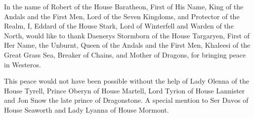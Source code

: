 In the name of Robert of the House Baratheon, First of His Name, King of the Andals and the First Men, Lord of the Seven Kingdoms, and Protector of the Realm, I, Eddard of the House Stark, Lord of Winterfell and Warden of the North, would like to thank Daenerys Stormborn of the House Targaryen, First of Her Name, the Unburnt, Queen of the Andals and the First Men, Khaleesi of the Great Grass Sea, Breaker of Chains, and Mother of Dragons, for bringing peace in Westeros.

This peace would not have been possible without the help of Lady Olenna of the House Tyrell, Prince Oberyn of House Martell, Lord Tyrion of House Lannister and Jon Snow the late prince of Dragonstone.
A special mention to Ser Davos of House Seaworth and Lady Lyanna of House Mormont.